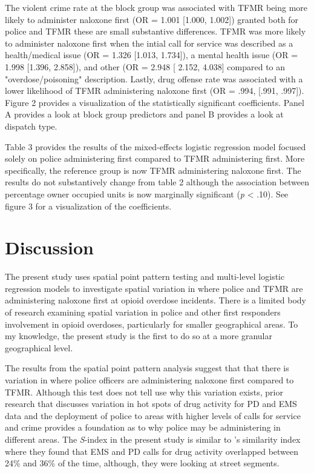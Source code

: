 The violent crime rate at the block group was associated with TFMR being more likely to administer naloxone first (OR = 1.001 [1.000, 1.002]) granted both for police and TFMR these are small substantive differences. TFMR was more likely to administer naloxone first when the intial call for service was described as a health/medical issue (OR = 1.326 [1.013, 1.734]), a mental health issue (OR = 1.998 [1.396, 2.858]), and other (OR = 2.948 [ 2.152, 4.038] compared to an "overdose/poisoning" description. Lastly, drug offense rate was associated with a lower likelihood of TFMR administering naloxone first (OR = .994, [.991, .997]). Figure 2 provides a visualization of the statistically significant coefficients. Panel A provides a look at block group predictors and panel B provides a look at dispatch type.

Table 3 provides the results of the mixed-effects logistic regression model focused solely on police administering first compared to TFMR administering first. More specifically, the reference group is now TFMR administering naloxone first. The results do not substantively change from table 2 although the association between percentage owner occupied units is now marginally significant (\textit{p} < .10). See figure 3 for a visualization of the coefficients.

\section{\centering Discussion}
The present study uses spatial point pattern testing and multi-level logistic regression models to investigate spatial variation in where police and TFMR are administering naloxone first at opioid overdose incidents. There is a limited body of research examining spatial variation in police and other first responders involvement in opioid overdoses, particularly for smaller geographical areas. To my knowledge, the present study is the first to do so at a more granular geographical level. 

The results from the spatial point pattern analysis suggest that that there is variation in where police officers are administering naloxone first compared to TFMR. Although this test does not tell use why this variation exists, prior research that discusses variation in hot spots of drug activity for PD and EMS data \parencite{hibdon_concentration_2017, hibdon_going_2021} and the deployment of police to areas with higher levels of calls for service and crime \parencite{engel_police_2003} provides a foundation as to why police may be administering in different areas. The \textit{S}-index in the present study is similar to \textcite{hibdon_concentration_2017}'s similarity index where they found that EMS and PD calls for drug activity overlapped between 24\% and 36\% of the time, although, they were looking at street segments. 

